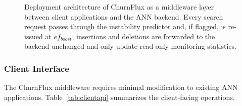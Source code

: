 \documentclass{ieeeaccess}
\begin{document}
\begin{figure}[!t]
\centering
{}
\caption{Deployment architecture of ChurnFlux as a middleware layer between client applications and the ANN backend. Every search request passes through the instability predictor and, if flagged, is re-issued at $ef_{boost}$; insertions and deletions are forwarded to the backend unchanged and only update read-only monitoring statistics.}
\label{fig:deployment}
\end{figure}

\subsubsection{Client Interface}

The ChurnFlux middleware requires minimal modification to existing ANN applications. Table~\ref{tab:clientapi} summarizes the client-facing operations.
\end{document}
